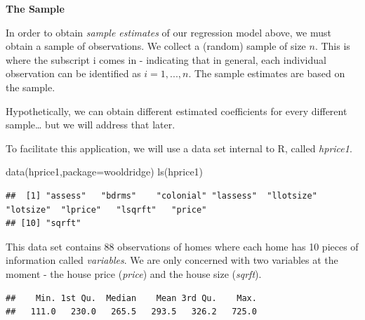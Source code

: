 \documentclass[
]{book}
\newenvironment{Shaded}{\begin{snugshade}}{\end{snugshade}}
\newcommand{\AttributeTok}[1]{\textcolor[rgb]{0.77,0.63,0.00}{#1}}
\newcommand{\FunctionTok}[1]{\textcolor[rgb]{0.00,0.00,0.00}{#1}}
\newcommand{\NormalTok}[1]{#1}
\newcommand{\SpecialCharTok}[1]{\textcolor[rgb]{0.00,0.00,0.00}{#1}}
\newcommand{\StringTok}[1]{\textcolor[rgb]{0.31,0.60,0.02}{#1}}
\begin{document}
\textbf{The Sample}

In order to obtain \emph{sample estimates} of our regression model above, we must obtain a sample of observations. We collect a (random) sample of size \(n\). This is where the subscript i comes in - indicating that in general, each individual observation can be identified as \(i=1,...,n\). The sample estimates are based on the sample.

Hypothetically, we can obtain different estimated coefficients for every different sample\ldots{} but we will address that later.

To facilitate this application, we will use a data set internal to R, called \emph{hprice1}.

\begin{Shaded}
\begin{Highlighting}[]
\FunctionTok{data}\NormalTok{(hprice1,}\AttributeTok{package=}\StringTok{\textquotesingle{}wooldridge\textquotesingle{}}\NormalTok{)}
\FunctionTok{ls}\NormalTok{(hprice1)}
\end{Highlighting}
\end{Shaded}

\begin{verbatim}
##  [1] "assess"   "bdrms"    "colonial" "lassess"  "llotsize" "lotsize"  "lprice"   "lsqrft"   "price"   
## [10] "sqrft"
\end{verbatim}

This data set contains 88 observations of homes where each home has 10 pieces of information called \emph{variables}. We are only concerned with two variables at the moment - the house price (\emph{price}) and the house size (\emph{sqrft}).

\begin{Shaded}
\end{Shaded}

\begin{verbatim}
##    Min. 1st Qu.  Median    Mean 3rd Qu.    Max. 
##   111.0   230.0   265.5   293.5   326.2   725.0
\end{verbatim}

\begin{Shaded}
\end{Shaded}
\end{document}
